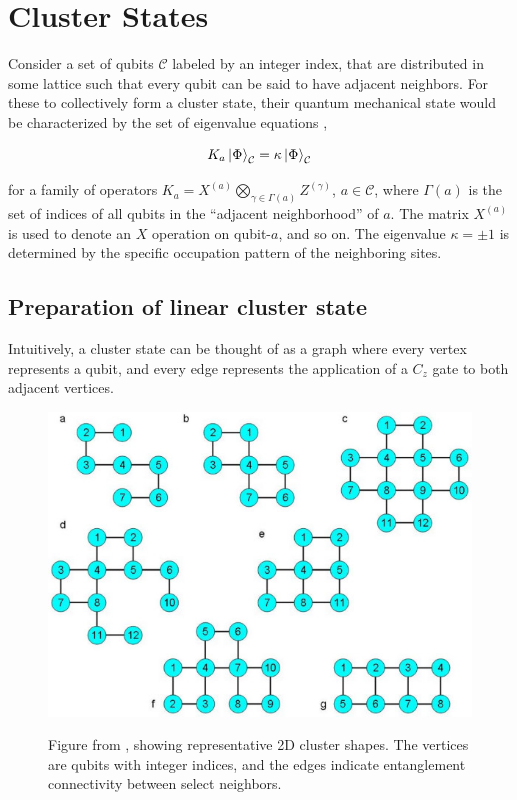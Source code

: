 \documentclass[twocolumn]{Styles/IEEEtran11}
\begin{document}
\section{Cluster States}
Consider a set of qubits $\mathcal{C}$ labeled by an integer index, that are distributed in some lattice such that every qubit can be said to have adjacent neighbors. For these to collectively form a cluster state, their quantum mechanical state would be characterized by the set of eigenvalue equations \cite{briegel2001persistent},

\begin{equation}
  K_a\left|\mspace{0.5mu} \Phi \mspace{0.5mu}\right\rangle_{\mathcal{C}}= \kappa\left|\mspace{0.5mu} \Phi \mspace{0.5mu}\right\rangle_{\mathcal{C}}\label{eq1}
\end{equation}

\noindent for a family of operators $K_a = X^{(a)}\bigotimes_{\gamma\in\Gamma(a)}Z^{(\gamma)}$, $a\in\mathcal{C}$, where $\Gamma(a)$ is the set of indices of all qubits in the ``adjacent neighborhood'' of $a$. The matrix $X^{(a)}$ is used to denote an $X$ operation on qubit-$a$, and so on. The eigenvalue $\kappa = \pm 1$ is determined by the specific occupation pattern of the neighboring sites. 

\subsection{Preparation of linear cluster state}


Intuitively, a cluster state can be thought of as a graph
where every vertex represents a qubit, and every edge represents the
application of a $C_z$ gate to both adjacent vertices.

\begin{figure}[thb]
  \centering
  \includegraphics[width=0.9\linewidth]{Images/2d_clusters_rep.jpg}
  \label{I2dclustersfig}
  \caption{Figure from \protect\cite{gerald2006efficient}, showing representative 2D cluster shapes. The vertices are qubits with integer indices, and the edges indicate entanglement connectivity between select neighbors.}
\end{figure}
\end{document}
